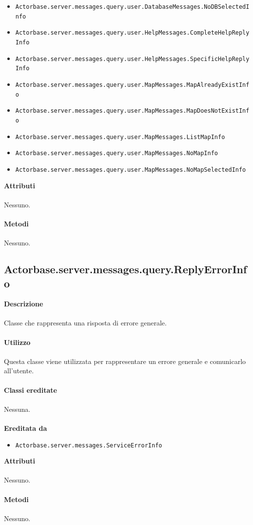 \documentclass[a4paper]{article}
\begin{document}
\begin{itemize}
  				\item \texttt{Actorbase.server.messages.query.user.DatabaseMessages.NoDBSelectedInfo }
  				\item \texttt{Actorbase.server.messages.query.user.HelpMessages.CompleteHelpReplyInfo }
  				\item \texttt{Actorbase.server.messages.query.user.HelpMessages.SpecificHelpReplyInfo }
  				\item \texttt{Actorbase.server.messages.query.user.MapMessages.MapAlreadyExistInfo }
  				\item \texttt{Actorbase.server.messages.query.user.MapMessages.MapDoesNotExistInfo }
  				\item \texttt{Actorbase.server.messages.query.user.MapMessages.ListMapInfo }
  				\item \texttt{Actorbase.server.messages.query.user.MapMessages.NoMapInfo }
  				\item \texttt{Actorbase.server.messages.query.user.MapMessages.NoMapSelectedInfo }
			\end{itemize}
		\textbf{Attributi}
			\\ \\
			Nessuno.
			\\ \\
		\textbf{Metodi}
			\\ \\
			Nessuno.
		
	\subsection{Actorbase.server.messages.query.ReplyErrorInfo}
		\textbf{Descrizione}
			\\ \\
			Classe che rappresenta una risposta di errore generale.
			\\ \\
		\textbf{Utilizzo}
			\\ \\
			Questa classe viene utilizzata per rappresentare un errore generale e comunicarlo all'utente.
			\\ \\
		\textbf{Classi ereditate}
			\\ \\
			Nessuna.
			\\ \\
		\textbf{Ereditata da}
			\begin{itemize}
				\item \texttt{Actorbase.server.messages.ServiceErrorInfo }
			\end{itemize}
		\textbf{Attributi}
			\\ \\
			Nessuno.
			\\ \\
		\textbf{Metodi}
			\\ \\
			Nessuno.
					
\end{document}
